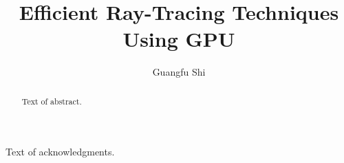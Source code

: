 \documentclass[12pt]{report}
\author{Guangfu Shi}
\title{Efficient Ray-Tracing Techniques Using GPU}
\begin{document}
\begin{abstract}
  Text of abstract.  
\end{abstract}

\begin{acknowledgments}
  Text of acknowledgments.
\end{acknowledgments}


\setcounter{page}{1}



%

%

%

%

%




\end{document}
